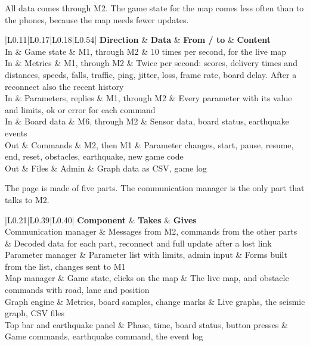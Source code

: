 \documentclass[
  english,
  10pt,
  a4paper,
]{article}
\newcommand{\ckkeep}[1]{\par\noindent\begin{minipage}{\linewidth}\setlength{\parskip}{4pt}#1\end{minipage}\par\smallskip}
\begin{document}

\ckkeep{%
All data comes through M2. The game state for the map comes less often than to the phones, because
the map needs fewer updates.

\begin{tabular}{|L{0.11}|L{0.17}|L{0.18}|L{0.54}|}
\hline \textbf{Direction} & \textbf{Data} & \textbf{From / to} & \textbf{Content} \\ \hline 
In & Game state & M1, through M2 & 10 times per second, for the live map \\ \hline
In & Metrics & M1, through M2 & Twice per second: scores, delivery times and distances, speeds, falls, traffic, ping, jitter, loss, frame rate, board delay. After a reconnect also the recent history \\ \hline
In & Parameters, replies & M1, through M2 & Every parameter with its value and limits, ok or error for each command \\ \hline
In & Board data & M6, through M2 & Sensor data, board status, earthquake events \\ \hline
Out & Commands & M2, then M1 & Parameter changes, start, pause, resume, end, reset, obstacles, earthquake, new game code \\ \hline
Out & Files & Admin & Graph data as CSV, game log \\ \hline
\end{tabular}}


\ckkeep{%
The page is made of five parts. The communication manager is the only part that talks to M2.

\begin{tabular}{|L{0.21}|L{0.39}|L{0.40}|}
\hline \textbf{Component} & \textbf{Takes} & \textbf{Gives} \\ \hline 
Communication manager & Messages from M2, commands from the other parts & Decoded data for each part, reconnect and full update after a lost link \\ \hline
Parameter manager & Parameter list with limits, admin input & Forms built from the list, changes sent to M1 \\ \hline
Map manager & Game state, clicks on the map & The live map, and obstacle commands with road, lane and position \\ \hline
Graph engine & Metrics, board samples, change marks & Live graphs, the seismic graph, CSV files \\ \hline
Top bar and earthquake panel & Phase, time, board status, button presses & Game commands, earthquake command, the event log \\ \hline
\end{tabular}}
\end{document}
